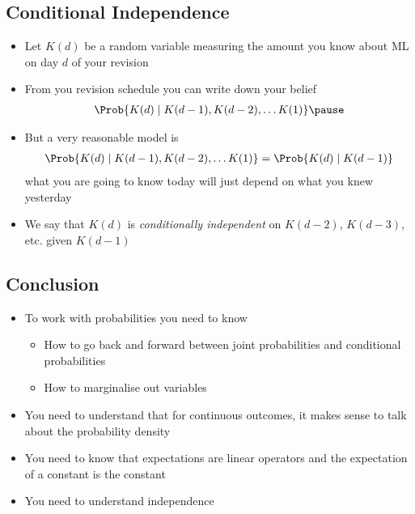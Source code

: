 
\begin{slide}
\section[-2]{Conditional Independence}

\begin{PauseHighLight}
  \begin{itemize}
  \item Let $K(d)$ be a random variable measuring the amount you know
    about ML on day $d$ of your revision\pause
  \item From you revision schedule you can write down your belief
    \begin{align*}
      \Prob{K(d) \mid K(d-1), K(d-2), \ldots K(1)}\pause
    \end{align*}
  \item But a very reasonable model is
    \begin{align*}
      \Prob{K(d) \mid K(d-1), K(d-2), \ldots K(1)} = \Prob{K(d)\mid K(d-1)}
    \end{align*}
    what you are going to know today will just depend on what you knew
    yesterday\pause
  \item We say that $K(d)$ is \emph{conditionally independent }on $K(d-2)$,
    $K(d-3)$, etc.{} given $K(d-1)$\pause
  \end{itemize}
\end{PauseHighLight}

\end{slide}



\begin{slide}
\section{Conclusion}
  
\begin{PauseHighLight}
  \begin{itemize}
  \item To work with probabilities you need to know
    \begin{itemize}
    \item How to go back and forward between joint
      probabilities and conditional probabilities
    \item How to marginalise out variables\pause
    \end{itemize}
  \item You need to understand that for continuous outcomes, it
    makes sense to talk about the probability density\pause
  \item You need to know that expectations are linear operators and
    the expectation of a constant is the constant\pause
  \item You need to understand independence\pause
  \end{itemize}
\end{PauseHighLight}

\end{slide}


